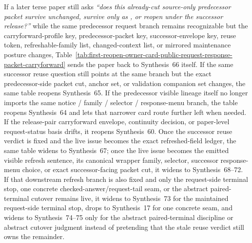 \documentclass[11pt]{article}
\begin{document}
If a later terse paper still asks \emph{``does this already-cut source-only predecessor packet survive unchanged, survive only as , or reopen under the successor release?''} while the same predecessor request branch remains recognizable but the carryforward-profile key, predecessor-packet key, successor-envelope key, reuse token, refreshable-family list, changed-context list, or mirrored maintenance posture changes, Table~\ref{tab:first-reopen-owner-card-public-request-response-packet-carryforward} sends the paper back to Synthesis~66 itself. If the same successor reuse question still points at the same branch but the exact predecessor-side packet cut, anchor set, or validation companion set changes, the same table reopens Synthesis~65. If the predecessor visible lineage itself no longer imports the same notice / family / selector / response-menu branch, the table reopens Synthesis~64 and lets that narrower card route further left when needed. If the release-pair carryforward envelope, continuity decision, or paper-level request-status basis drifts, it reopens Synthesis~60. Once the successor reuse verdict is fixed and the live issue becomes the exact refreshed-field ledger, the same table widens to Synthesis~67; once the live issue becomes the emitted visible refresh sentence, its canonical wrapper family, selector, successor response-menu choice, or exact successor-facing packet cut, it widens to Synthesis~68--72. If that downstream refresh branch is also fixed and only the request-side terminal stop, one concrete checked-answer/request-tail seam, or the abstract paired-terminal cutover remains live, it widens to Synthesis~73 for the maintained request-side terminal stop, drops to Synthesis~17 for one concrete seam, and widens to Synthesis~74--75 only for the abstract paired-terminal discipline or abstract cutover judgment instead of pretending that the stale reuse verdict still owns the remainder.\cite{series:publicrequestcarryforward,series:publicrequestresponsemenus,series:publicrequestresponsepackets,series:publicrequestresponsepacketdeltas,series:publicrequestresponsepacketrefreshnotices,series:publicrequestresponsepacketrefreshnoticenormalforms,series:publicrequestresponsepacketrefreshnoticeselections,series:publicrequestresponsepacketrefreshresponsemenus,series:publicrequestresponsepacketrefreshresponsepackets,series:publicrequestresponsepacketrefreshresponsepacketclosureverdicts,series:pairedterminalcitationdiscipline,series:pairedterminalcutoverrule}
\end{document}
